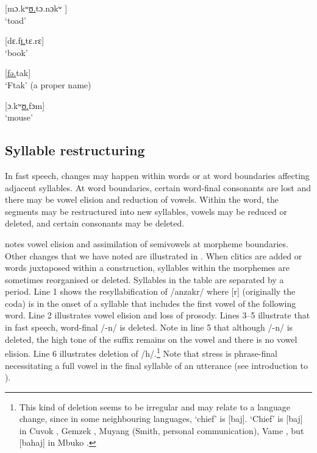 \ea \label{ex:2:60}
\textup{[}\textup{mɔ.kʷ}\underline{\textup{ʊ.}}\textup{tɔ.nɔkʷ}\textup{ ]}\\
\glt  ‘toad’
\z

\ea \label{ex:2:61}
\textup{[dɛ.f}\underline{\textup{ɪ.}}\textup{tɛ.rɛ}\textup{]}\\
\glt  ‘book’
\z

\ea \label{ex:2:62}
\textup{[}\underline{\textup{fə.}}\textup{tak}\textup{]}\\
\glt  ‘Ftak’ (a proper name)
\z

\ea \label{ex:2:63}
[ɔ.kʷ\underline{ʊ.}fɔm]\\
\glt  ‘mouse’
\z

\subsection{Syllable restructuring}\label{sec:2.5.2}
\hypertarget{RefHeading1210721525720847}{}
In fast speech, changes may happen within words or at word boundaries affecting adjacent syllables. At word boundaries, certain word-final consonants are lost and there may be vowel elision and reduction of vowels. Within the word, the segments may be restructured into new syllables, vowels may be reduced or deleted, and certain consonants may be deleted.

\citet{Bow1997c} notes vowel elision and  assimilation of semivowels at morpheme boundaries. Other changes that we have noted are illustrated in . When clitics are added or words juxtaposed within a construction, syllables within the morphemes are sometimes reorganised or deleted. Syllables in the table are separated by a period. Line 1 shows the resyllabification of /anzakr/ where [r] (originally the coda) is in the onset of a syllable that includes the first vowel of the following word. Line 2 illustrates vowel elision and loss of prosody. Lines 3--5 illustrate that in fast speech, word-final /-n/ is deleted. Note in line 5 that although /-n/ is deleted, the high tone of the suffix remains on the vowel and there is no vowel elision. Line 6 illustrates deletion of /h/.\footnote{This kind of deletion seems to be irregular and may relate to a language change, since in some neighbouring languages, ‘chief’ is [baj]. ‘Chief' is [baj] in Cuvok \citep[120]{Ndokobai2006}, Gemzek \citep[9]{Gravina2005}, Muyang (Smith, personal communication), Vame \citep[17]{Kinnaird2006}, but [bahaj] in Mbuko \citep[9]{Gravina2001}.} Note that stress is phrase-final necessitating a full vowel in the final syllable of an utterance (see introduction to ).

